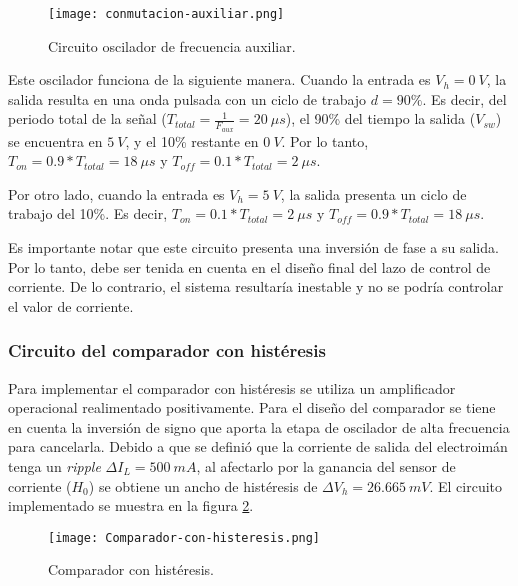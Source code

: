 \begin{figure}[H]
	\centering
	\texttt{[image: conmutacion-auxiliar.png]}
	\caption{Circuito oscilador de frecuencia auxiliar.}
	\label{fig:img_frecuencia-auxiliar}
\end{figure}


%
%

Este oscilador funciona de la siguiente manera. Cuando la entrada es $V_h=0\:V$, la salida resulta en una onda pulsada con un  ciclo de trabajo $d=90\%$. Es decir, del periodo total de la señal ($T_{total}=\frac{1}{F_{aux}}=20\:\mu s$), el 90\% del tiempo la salida ($V_{sw}$) se encuentra en $5\:V$, y el 10\% restante en $0\:V$. Por lo tanto, $T_{on}=0.9*T_{total}=18\:\mu s$ y $T_{off}=0.1*T_{total}=2\:\mu s$.

Por otro lado, cuando la entrada es $V_h=5\:V$, la salida presenta un ciclo de trabajo del 10\%. Es decir, $T_{on}=0.1*T_{total}=2\:\mu s$ y $T_{off}=0.9*T_{total}=18\:\mu s$.

Es importante notar que este circuito presenta una inversión de fase a su salida. Por lo tanto, debe ser tenida en cuenta en el diseño final del lazo de control de corriente. De lo contrario, el sistema resultaría inestable y no se podría controlar el valor de corriente.

\subsubsection{Circuito del comparador con histéresis}

Para implementar el comparador con histéresis se utiliza un amplificador operacional realimentado positivamente. Para el diseño del comparador se tiene en cuenta la inversión de signo que aporta la etapa de oscilador de alta frecuencia para cancelarla. Debido a que se definió que la corriente de salida del electroimán tenga un \textsl{ripple} $\Delta I_L=500\:mA$, al afectarlo por la ganancia del sensor de corriente ($H_0$) se obtiene un ancho de histéresis de $\Delta V_h=26.665\:mV$. El circuito implementado se muestra en la figura \ref{fig:img_comp-con-hist}.

\begin{figure}[H]
	\centering
	\texttt{[image: Comparador-con-histeresis.png]}
	\caption{Comparador con histéresis.}
	\label{fig:img_comp-con-hist}
\end{figure}

